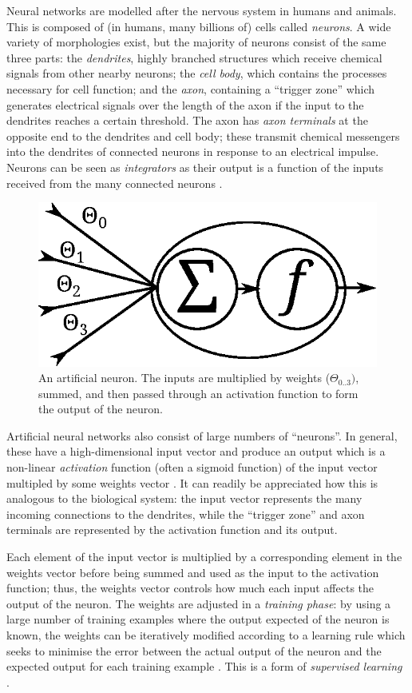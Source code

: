 Neural networks are modelled after the nervous system in humans and animals.  This is composed of (in humans, many billions of) cells called \emph{neurons}.  A wide variety of morphologies exist, but the majority of neurons consist of the same three parts: the \emph{dendrites}, highly branched structures which receive chemical signals from other nearby neurons; the \emph{cell body}, which contains the processes necessary for cell function; and the \emph{axon}, containing a ``trigger zone'' which generates electrical signals over the length of the axon if the input to the dendrites reaches a certain threshold.  The axon has \emph{axon terminals} at the opposite end to the dendrites and cell body; these transmit chemical messengers into the dendrites of connected neurons in response to an electrical impulse.  Neurons can be seen as \emph{integrators} as their output is a function of the inputs received from the many connected neurons \cite[p. 152]{Vander}.

\begin{figure}[ht]
\centering
\includegraphics[width=0.5\linewidth]{diagrams/neuron}
\caption[An artificial neuron]{An artificial neuron.  The inputs are multiplied by weights ($\Theta_{0..3})$, summed, and then passed through an activation function to form the output of the neuron.}
\label{fig:neuron}
\end{figure}

Artificial neural networks also consist of large numbers of ``neurons''.  In general, these have a high-dimensional input vector and produce an output which is a non-linear \emph{activation} function (often a sigmoid function) of the input vector multipled by some weights vector \cite[p. 1]{Annema1995}.  It can readily be appreciated how this is analogous to the biological system: the input vector represents the many incoming connections to the dendrites, while the ``trigger zone'' and axon terminals are represented by the activation function and its output.

Each element of the input vector is multiplied by a corresponding element in the weights vector before being summed and used as the input to the activation function; thus, the weights vector controls how much each input affects the output of the neuron.  The weights are adjusted in a \emph{training phase}: by using a large number of training examples where the output expected of the neuron is known, the weights can be iteratively modified according to a learning rule which seeks to minimise the error between the actual output of the neuron and the expected output for each training example \cite[p. 1]{Annema1995}.  This is a form of \emph{supervised learning} \cite[p. 695]{RussellNorvig}.

